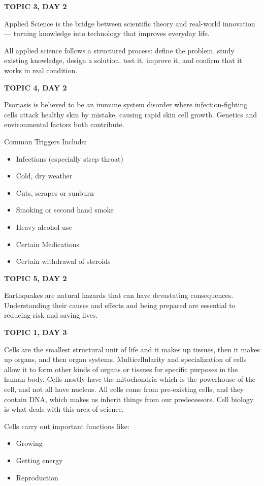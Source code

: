 {{{\textbf{TOPIC 3, DAY 2}


Applied Science is the bridge between scientific theory and real-world innovation — turning knowledge into technology that improves everyday life. 


All applied science follows a structured process: define the problem, study existing knowledge, design a solution, test it, improve it, and confirm that it works in real condition. 

\textbf{TOPIC 4, DAY 2}


Psoriasis is believed to be an immune system disorder where infection-fighting cells attack healthy skin by mistake, causing rapid skin cell growth. Genetics and environmental factors both contribute. 


Common Triggers Include:
\begin{itemize}
    \item Infections (especially strep throat)
    \item Cold, dry weather 
    \item Cuts, scrapes or sunburn 
    \item Smoking or second hand smoke 
    \item Heavy alcohol use 
    \item Certain Medications 
    \item Certain withdrawal of steroids 
\end{itemize}

\textbf{TOPIC 5, DAY 2}


Earthquakes are natural hazards that can have devastating consequences. Understanding their causes and effects and being prepared are essential to reducing risk and saving lives. 

\textbf{TOPIC 1, DAY 3}


Cells are the smallest structural unit of life and it makes up tissues, then it makes up organs, and then organ systems. Multicellularity and specialization of cells allow it to form other kinds of organs or tissues for specific purposes in the human body. Cells mostly have the mitochondria which is the powerhouse of the cell, and not all have nucleus. All cells come from pre-existing cells, and they contain DNA, which makes us inherit things from our predecessors. Cell biology is what deals with this area of science. 

Cells carry out important functions like:
\begin{itemize}
    \item Growing
    \item Getting energy
    \item Reproduction
\end{itemize}


}}}
